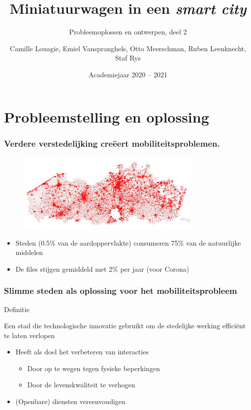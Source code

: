 \documentclass[aspectratio=169,kulak,t,handout]{kulakbeamer} %
\title[Groep 1 - Safety First]{Miniatuurwagen in een \textsl{smart city}}
\subtitle{Probleemoplossen en ontwerpen, deel 2}
\author{Camille Louagie, Emiel Vanspranghels, Otto Meerschman, Ruben Leenknecht, Staf Rys}
\institute[Kulak]{KU Leuven Kulak}
\date{Academiejaar 2020 -- 2021}
\begin{document}
\begin{titleframe}
\titlepage
\end{titleframe}


\section*{Probleemstelling en oplossing}

\begin{frame}
	\frametitle{\Large Verdere verstedelijking creëert mobiliteitsproblemen.}


	\begin{figure}
		\centering
		\includegraphics[width=.6\textwidth]{ruimtelijkestaat}
		
		\label{fig:ruimtelijkestaat}
	\end{figure}
	\begin{itemize}
	\item  Steden (0.5\% van de aardoppervlakte) consumeren 75\% van de natuurlijke middelen 	
	\item  De files stijgen gemiddeld met 2\% per jaar (voor Corona)
\end{itemize}

\end{frame}

\begin{frame}
	\frametitle{{\Large Slimme steden als oplossing voor het mobiliteitsprobleem}}
	
\begin{block}{Definitie}
	
	Een stad die technologische innovatie gebruikt om de stedelijke werking efficiënt te laten verlopen
	
\end{block}	
	\begin{itemize}
		\large\item  Heeft als doel het verbeteren van interacties
		\begin{itemize}
			\normalsize\item Door op te wegen tegen fysieke beperkingen
			\item Door de levenskwaliteit te verhogen
		\end{itemize}
		\item  (Openbare) diensten vereenvoudigen
	\end{itemize}
\end{frame}
\end{document}
